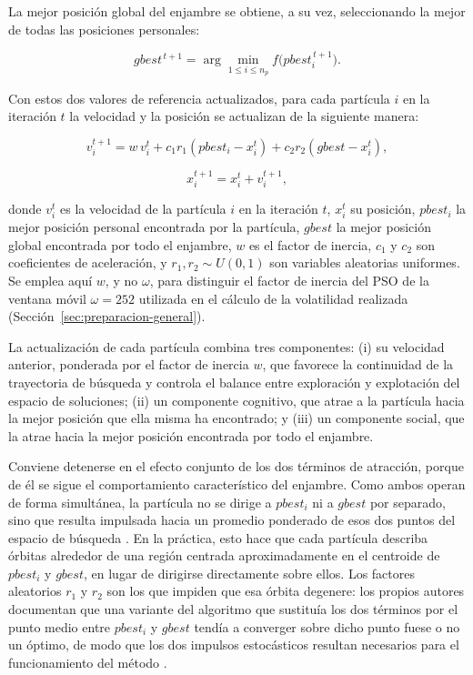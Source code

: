 \documentclass[12pt]{paper}
\begin{document}
La mejor posición global del enjambre se obtiene, a su vez, seleccionando la mejor de todas las posiciones personales:

\begin{equation}
gbest^{\,t+1} = \arg\min_{1 \le i \le n_p} f\bigl(pbest_i^{\,t+1}\bigr).
\end{equation}

Con estos dos valores de referencia actualizados, para cada partícula $i$ en la iteración $t$ la velocidad y la posición se actualizan de la siguiente manera:

\begin{equation}
v_i^{t+1} = w\, v_i^{t} + c_1 r_1 (pbest_i - x_i^{t}) + c_2 r_2 (gbest - x_i^{t}),
\end{equation}

\begin{equation}
x_i^{t+1} = x_i^{t} + v_i^{t+1},
\end{equation}

donde $v_i^{t}$ es la velocidad de la partícula $i$ en la iteración $t$, $x_i^{t}$ su posición, $pbest_i$ la mejor posición personal encontrada por la partícula, $gbest$ la mejor posición global encontrada por todo el enjambre, $w$ es el factor de inercia, $c_1$ y $c_2$ son coeficientes de aceleración, y $r_1, r_2 \sim U(0,1)$ son variables aleatorias uniformes. Se emplea aquí $w$, y no $\omega$, para distinguir el factor de inercia del PSO de la ventana móvil $\omega = 252$ utilizada en el cálculo de la volatilidad realizada (Sección~\ref{sec:preparacion-general}).

La actualización de cada partícula combina tres componentes: (i) su velocidad anterior, ponderada por el factor de inercia $w$, que favorece la continuidad de la trayectoria de búsqueda y controla el balance entre exploración y explotación del espacio de soluciones; (ii) un componente cognitivo, que atrae a la partícula hacia la mejor posición que ella misma ha encontrado; y (iii) un componente social, que la atrae hacia la mejor posición encontrada por todo el enjambre.

Conviene detenerse en el efecto conjunto de los dos términos de atracción, porque de él se sigue el comportamiento característico del enjambre. Como ambos operan de forma simultánea, la partícula no se dirige a $pbest_i$ ni a $gbest$ por separado, sino que resulta impulsada hacia un promedio ponderado de esos dos puntos del espacio de búsqueda \citep{kennedy1995}. En la práctica, esto hace que cada partícula describa órbitas alrededor de una región centrada aproximadamente en el centroide de $pbest_i$ y $gbest$, en lugar de dirigirse directamente sobre ellos. Los factores aleatorios $r_1$ y $r_2$ son los que impiden que esa órbita degenere: los propios autores documentan que una variante del algoritmo que sustituía los dos términos por el punto medio entre $pbest_i$ y $gbest$ tendía a converger sobre dicho punto fuese o no un óptimo, de modo que los dos impulsos estocásticos resultan necesarios para el funcionamiento del método \citep{kennedy1995}.
\end{document}
